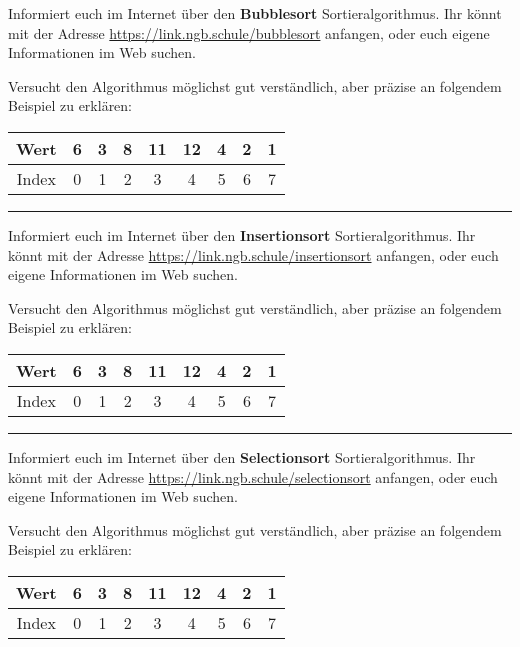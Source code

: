 \documentclass[11pt, a5paper, landscape, ngerman]{arbeitsblatt}
\begin{document}
\ReiheTitel[Bubblesort]

Informiert euch im Internet über den \textbf{Bubblesort} Sortieralgorithmus.
Ihr könnt mit der Adresse \url{https://link.ngb.schule/bubblesort} anfangen, oder euch eigene
Informationen im Web suchen.

Versucht den Algorithmus möglichst gut verständlich, aber präzise an folgendem
Beispiel zu erklären:

\begin{center}
	\begin{tabular}{|*{9}{c|}}\hline
		Wert  & 6 & 3 & 8 & 11 & 12 & 4 & 2 & 1 \\ \hline
		\rowcolor{muted.hg}
		Index & 0 & 1 & 2 & 3  & 4  & 5 & 6 & 7 \\ \hline
	\end{tabular}
\end{center}


\rule{\textwidth}{.2pt}

\newpage
\ReiheTitel[Insertionsort]

Informiert euch im Internet über den \textbf{Insertionsort} Sortieralgorithmus.
Ihr könnt mit der Adresse \url{https://link.ngb.schule/insertionsort} anfangen, oder euch eigene
Informationen im Web suchen.

Versucht den Algorithmus möglichst gut verständlich, aber präzise an folgendem
Beispiel zu erklären:

\begin{center}
	\begin{tabular}{|*{9}{c|}}\hline
		Wert  & 6 & 3 & 8 & 11 & 12 & 4 & 2 & 1 \\ \hline
		\rowcolor{muted.hg}
		Index & 0 & 1 & 2 & 3  & 4  & 5 & 6 & 7 \\ \hline
	\end{tabular}
\end{center}


\rule{\textwidth}{.2pt}

\newpage
\ReiheTitel[Selectionsort]

Informiert euch im Internet über den \textbf{Selectionsort} Sortieralgorithmus.
Ihr könnt mit der Adresse \url{https://link.ngb.schule/selectionsort} anfangen, oder euch eigene
Informationen im Web suchen.

Versucht den Algorithmus möglichst gut verständlich, aber präzise an folgendem
Beispiel zu erklären:

\begin{center}
	\begin{tabular}{|*{9}{c|}}\hline
		Wert  & 6 & 3 & 8 & 11 & 12 & 4 & 2 & 1 \\ \hline
		\rowcolor{muted.hg}
		Index & 0 & 1 & 2 & 3  & 4  & 5 & 6 & 7 \\ \hline
	\end{tabular}
\end{center}

\end{document}
